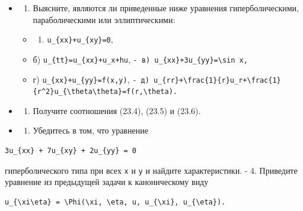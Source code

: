 \documentclass[
  ukrainian,
]{article}
\providecommand{\tightlist}{%
  \setlength{\itemsep}{0pt}\setlength{\parskip}{0pt}}
\begin{document}
\begin{itemize}
\item
  \begin{enumerate}
  \def\labelenumi{\arabic{enumi}.}
  \tightlist
  \item
    Выясните, являются ли приведенные ниже уравнения гиперболическими,
    параболическими или эллиптическими:
  \end{enumerate}

  \begin{itemize}
  \tightlist
  \item
    \begin{enumerate}
    \def\labelenumi{\alph{enumi})}
    \tightlist
    \item
      \texttt{u\_\{xx\}+u\_\{xy\}=0},
    \end{enumerate}
  \item
    б) \texttt{u\_\{tt\}=u\_\{xx\}+u\_x+hu},
    \texttt{-\ в)\ \textquotesingle{}u\_\{xx\}+3u\_\{yy\}=\textbackslash{}sin\ x\textquotesingle{},}
  \item
    г) \texttt{u\_\{xx\}+u\_\{yy\}=f(x,y)},
    \texttt{-\ д)\ \textquotesingle{}u\_\{rr\}+\textbackslash{}frac\{1\}\{r\}u\_r+\textbackslash{}frac\{1\}\{r\^{}2\}u\_\{\textbackslash{}theta\textbackslash{}theta\}=f(r,\textbackslash{}theta)\textquotesingle{}.}
  \end{itemize}
\item
  \begin{enumerate}
  \def\labelenumi{\arabic{enumi}.}
  \setcounter{enumi}{1}
  \tightlist
  \item
    Получите соотношения (23.4), (23.5) и (23.6).
  \end{enumerate}
\item
  \begin{enumerate}
  \def\labelenumi{\arabic{enumi}.}
  \setcounter{enumi}{2}
  \tightlist
  \item
    Убедитесь в том, что уравнение
  \end{enumerate}
\end{itemize}

\begin{verbatim}
3u_{xx} + 7u_{xy} + 2u_{yy} = 0
\end{verbatim}

гиперболического типа при всех \texttt{x} и \texttt{y} и найдите
характеристики. - 4. Приведите уравнение из предыдущей задачи к
каноническому виду

\begin{verbatim}
u_{\xi\eta} = \Phi(\xi, \eta, u, u_{\xi}, u_{\eta}).
\end{verbatim}
\end{document}
